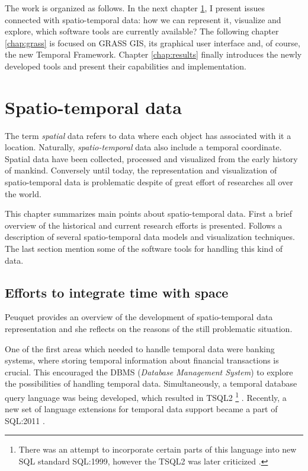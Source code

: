 \documentclass[a4paper,12pt,oneside]{book}
\newcommand{\tf}{Temporal Framework\xspace}
\begin{document}
The work is organized as follows. In the next chapter \ref{chap:stdata}, I present issues connected with spatio-temporal data:
how we can represent it, visualize and explore, which software tools are currently available?
The following chapter \ref{chap:grass} is focused on GRASS GIS, its graphical user interface and, of course, the new \tf.
Chapter \ref{chap:results} finally introduces the newly developed tools and present their capabilities and implementation.







\chapter{Spatio-temporal data}
\label{chap:stdata}
The term \emph{spatial} data refers to data where each object has associated with it a location.
Naturally, \emph{spatio-temporal} data also include a temporal coordinate.
Spatial data have been collected, processed and visualized from the early history of mankind.
Conversely until today, the representation and visualization of spatio-temporal data
is problematic despite of great effort of researches all over the world.

This chapter summarizes main points about spatio-temporal data.
First a brief overview of the historical and current research efforts is presented.
Follows a description of several spatio-temporal data models and visualization techniques.
The last section mention some of the software tools for handling this kind of data.


\section{Efforts to integrate time with space}
Peuquet \cite{peuquet2001} provides an overview of the development of spatio-temporal data representation
and she reflects on the reasons of the still problematic situation.

One of the first areas which needed to handle temporal data were banking systems,
where storing temporal information about financial transactions is crucial.
This encouraged the DBMS (\emph{Database Management System}) to explore the possibilities of handling
temporal data. Simultaneously, a temporal database query language was being developed,
which resulted in TSQL2%
\footnote{There was an attempt to incorporate certain parts of this language
into new SQL standard SQL:1999, however the TSQL2 was later criticized
\cite{darwen2005}.} \cite{snodgrass1995}.
Recently, a new set of language extensions for temporal data support became a part of
SQL:2011 \cite{kulkarni2012}.
\end{document}
